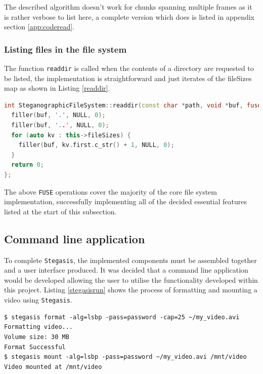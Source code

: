 \documentclass[paper=a4, fontsize=11pt,twoside]{scrartcl}
\numberwithin{table}{section}
\numberwithin{figure}{section}
\numberwithin{algorithm}{section}
\begin{document}
The described algorithm doesn't work for chunks spanning multiple frames as it is rather verbose to list here, a complete version which does is listed in appendix section \ref{app:coderead}.

\subsubsection{Listing files in the file system}

The function \texttt{readdir} is called when the contents of a directory are requested to be listed, the implementation is straightforward and just iterates of the fileSizes map as shown in Listing \ref{readdir}.\\

\begin{lstlisting}[language=C++, caption={\texttt{FUSE} readdir implementation (\texttt{fs/stegfs.cc:264}).}, frame=single, label=readdir,upquote=true,float,floatplacement=!Hhbt]
int SteganographicFileSystem::readdir(const char *path, void *buf, fuse_fill_dir_t filler, off_t offset, struct fuse_file_info *fi) {
  filler(buf, '.', NULL, 0);
  filler(buf, '..', NULL, 0);
  for (auto kv : this->fileSizes) {
    filler(buf, kv.first.c_str() + 1, NULL, 0);
  }
  return 0;
};
\end{lstlisting}

\noindent
The above \texttt{FUSE} operations cover the majority of the core file system implementation, successfully implementing all of the decided essential features listed at the start of this subsection.

\subsection{Command line application}

To complete \texttt{Stegasis}, the implemented components must be assembled together and a user interface produced. It was decided that a command line application would be developed allowing the user to utilise the functionality developed within this project. Listing \ref{stegasisrun} shows the process of formatting and mounting a video using \texttt{Stegasis}.

\begin{lstlisting}[caption={Using \texttt{Stagasis} to format and mount a video.}, frame=single, label=stegasisrun]
$ stegasis format -alg=lsbp -pass=password -cap=25 ~/my_video.avi
Formatting video...
Volume size: 30 MB
Format Successful
$ stegasis mount -alg=lsbp -pass=password ~/my_video.avi /mnt/video
Video mounted at /mnt/video
\end{lstlisting}
\end{document}
